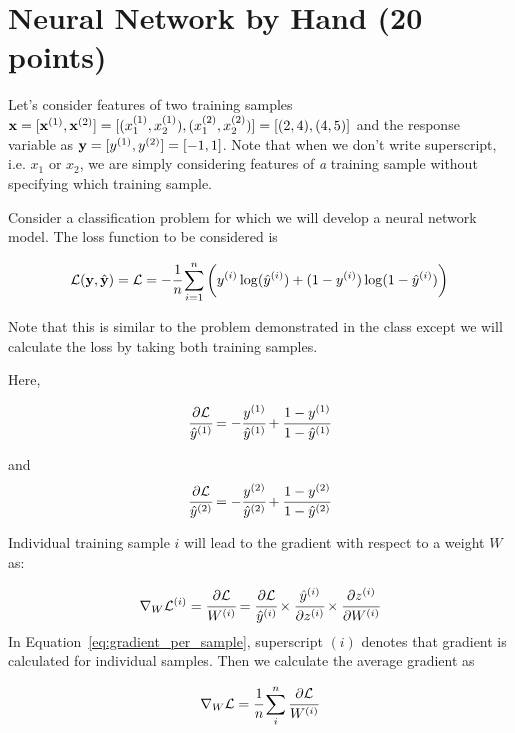 \documentclass[12pt, xcolor=dvipsnames,svgnames,x11names]{article}
\begin{document}
\section{Neural Network by Hand (20 points)}
\label{sec:neuralnetbyhand}
Let's consider features of two training samples ${\mathbf x} = [{\mathbf x}^{(1)}, {\mathbf x}^{(2)}] = [(x_1^{(1)}, x_2^{(1)}), (x_1^{(2)}, x_2^{(2)})] = [ (2, 4), (4, 5)]$ and the response variable as ${\mathbf y} = [ y^{(1)}, y^{(2)}] = [-1, 1]$. Note that when we don't write superscript, i.e. $x_1$ or $x_2$, we are simply considering features of \textit{a} training sample without specifying which training sample.

Consider a classification problem for which we will develop a neural network model. The loss function to be considered is 

$$
{\mathcal L} ( {\mathbf y}, \hat{{\mathbf y}}) = {\mathcal L} = -\cfrac{1}{n} \sum_{i=1}^n \bigg ( y^{(i)} \log({\hat y}^{(i)}) + (1- y^{(i)} )\log(1 - {\hat y}^{(i)} )  \bigg)
$$

Note that this is similar to the problem demonstrated in the class except we will calculate the loss by taking both training samples.

Here, 

$$
\cfrac{\partial {\mathcal L} }{{\hat y}^{(1)}} = -\cfrac{y^{(1)}}{{\hat y}^{(1)}}  + \cfrac{1 - y^{(1)}}{1 - {\hat y}^{(1)}}
$$

and
$$
\cfrac{\partial {\mathcal L} }{{\hat y}^{(2)}} = -\cfrac{y^{(2)}}{{\hat y}^{(2)}}  + \cfrac{1 - y^{(2)}}{1 - {\hat y}^{(2)}}
$$

Individual training sample $i$ will lead to the gradient with respect to a weight $W$ as:

\begin{equation}
\label{eq:gradient_per_sample}
    \begin{aligned}
\nabla_W {\mathcal L}^{(i)} = \cfrac{\partial {\mathcal L} }{W^{(i)}} = \cfrac{\partial {\mathcal L} }{{\hat y}^{(i)}} \times \cfrac{{\hat y}^{(i)}} {\partial z^{(i)}} \times \cfrac{\partial z^{(i)}}{\partial W^{(i)} } 
    \end{aligned}
\end{equation}
In Equation~\eqref{eq:gradient_per_sample}, superscript $(i)$ denotes that gradient is calculated for individual samples. Then we calculate the average gradient as

\begin{equation}
    \begin{aligned}
        \nabla_W {\mathcal L} = \cfrac{1}{n}\sum_i^n  \cfrac{\partial {\mathcal L} }{W^{(i)}} 
    \end{aligned}
\end{equation}
\end{document}
